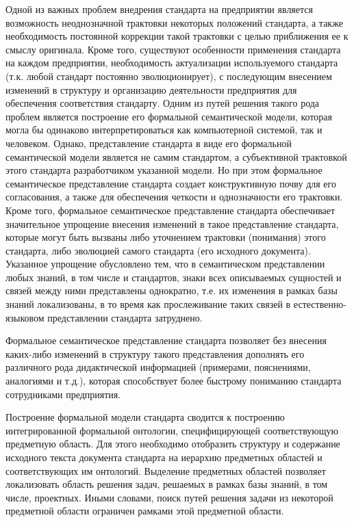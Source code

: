 \begin{SCn}
{	Одной из важных проблем внедрения стандарта на предприятии является возможность неоднозначной трактовки некоторых положений стандарта, а также необходимость постоянной коррекции такой трактовки с целью приближения ее к смыслу оригинала. Кроме того, существуют особенности применения стандарта на каждом предприятии, необходимость актуализации используемого стандарта (т.к. любой стандарт постоянно эволюционирует), с последующим внесением изменений в структуру и организацию деятельности предприятия для обеспечения соответствия стандарту. Одним из путей решения такого рода проблем является построение его формальной семантической модели, которая могла бы одинаково интерпретироваться как компьютерной системой, так и человеком. Однако, представление стандарта в виде его формальной семантической модели является не самим стандартом, а субъективной трактовкой этого стандарта разработчиком указанной модели. Но при этом формальное семантическое представление стандарта создает конструктивную почву для его согласования, а также для обеспечения четкости и однозначности его трактовки. Кроме того, формальное семантическое представление стандарта обеспечивает значительное упрощение внесения изменений в такое представление стандарта, которые могут быть вызваны либо уточнением трактовки (понимания) этого стандарта, либо эволюцией самого стандарта (его исходного документа). Указанное упрощение обусловлено тем, что в семантическом представлении любых знаний, в том числе и стандартов, знаки всех описываемых сущностей и связей между ними представлены однократно, т.е. их изменения в рамках базы знаний локализованы, в то время как прослеживание таких связей в естественно-языковом представлении стандарта затруднено.
	
	Формальное семантическое представление стандарта позволяет без внесения каких-либо изменений в структуру такого представления дополнять его различного рода дидактической информацией (примерами, пояснениями, аналогиями и т.д.), которая способствует более быстрому пониманию стандарта сотрудниками предприятия.
	
	Построение формальной модели стандарта сводится к построению интегрированной формальной онтологии, специфицирующей соответствующую предметную область. Для этого необходимо отобразить структуру и содержание исходного текста документа стандарта на иерархию предметных областей и соответствующих им онтологий. Выделение предметных областей позволяет локализовать область решения задач, решаемых в рамках базы знаний, в том числе, проектных. Иными словами, поиск путей решения задачи из некоторой предметной области ограничен рамками этой предметной области.
	
}
\end{SCn}
